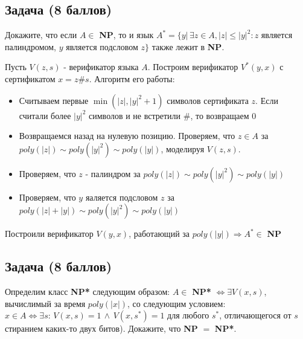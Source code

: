 \subsection{Задача \textbf{(8 баллов)}}

Докажите, что если $A \in$ \textbf{NP}, то и язык $A^* = \{y | \, \exists z \in A, |z| \leq |y|^2: z$ является палиндромом, $y$ является подсловом $z\}$ также лежит в \textbf{NP}.

\begin{solution}
    Пусть $V(z, s)$ - верификатор языка $A$. Построим верификатор $V^*(y, x)$ с сертификатом $x = z\#s$. Алгоритм его работы:
    \begin{itemize}
        \item  Считываем первые $\min(|z|, |y|^2 + 1)$ символов сертификата $z$. Если считали более $|y|^2$ символов и не встретили $\#$, то возвращаем $0$
        \item Возвращаемся назад на нулевую позицию. Проверяем, что $z \in A$ за $poly(|z|) \sim poly(|y|^2) \sim poly(|y|)$, моделируя $V(z, s)$.
        \item Проверяем, что $z$ - палиндром за $poly(|z|) \sim poly(|y|^2) \sim poly(|y|)$
        \item Проверяем, что $y$ яаляется подсловом $z$ за $poly(|z| + |y|) \sim poly(|y|^2) \sim poly(|y|)$
    \end{itemize}
    Построили верификатор $V(y, x)$, работающий за $poly(|y|) \Rightarrow A^* \in $ \textbf{NP}
\end{solution}


\subsection{Задача \textbf{(8 баллов)}}

Определим класс \textbf{NP*} следующим образом: $A \in $ \textbf{NP*} $\Leftrightarrow \exists V(x, s)$, вычислимый за время $poly(|x|)$, со следующим условием: $x \in A \Leftrightarrow \exists s: \, V(x, s) = 1 \, \wedge \, V(x, s^*) = 1$ для любого $s^*$, отличающегося от $s$ стиранием каких-то двух битов). Докажите, что \textbf{NP} $=$ \textbf{NP*}.

